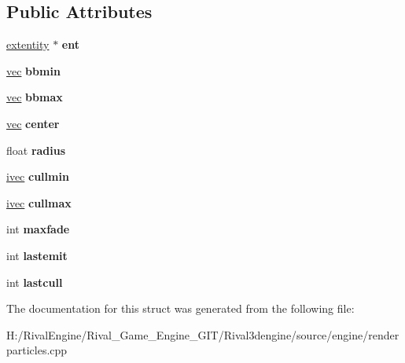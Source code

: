 \subsection*{Public Attributes}
\begin{DoxyCompactItemize}
\item 
\mbox{\label{structparticleemitter_a227cb6d3ccb8161b37e619051ff12115}} 
\hyperlink{structextentity}{extentity} $\ast$ {\bfseries ent}
\item 
\mbox{\label{structparticleemitter_a873b76c6e23d88732959a92e101f4396}} 
\hyperlink{structvec}{vec} {\bfseries bbmin}
\item 
\mbox{\label{structparticleemitter_a7436492610148e7f60366fd35efc529e}} 
\hyperlink{structvec}{vec} {\bfseries bbmax}
\item 
\mbox{\label{structparticleemitter_a535d90a0b4a4eb18e8eb6ff25d6d6117}} 
\hyperlink{structvec}{vec} {\bfseries center}
\item 
\mbox{\label{structparticleemitter_a2b1d94e711922c2f55142320bab257d0}} 
float {\bfseries radius}
\item 
\mbox{\label{structparticleemitter_ad4ea3a6d198c1d65aea2d0fa5afe6287}} 
\hyperlink{structivec}{ivec} {\bfseries cullmin}
\item 
\mbox{\label{structparticleemitter_ac090d7490c95e5e581994d4def8d6dca}} 
\hyperlink{structivec}{ivec} {\bfseries cullmax}
\item 
\mbox{\label{structparticleemitter_ad85ac6f61c5ca949e1042ad162535429}} 
int {\bfseries maxfade}
\item 
\mbox{\label{structparticleemitter_a5441af216e1d41efcdc3b51d140aba87}} 
int {\bfseries lastemit}
\item 
\mbox{\label{structparticleemitter_a224af73b2c79586ea24765ca3bdb57b9}} 
int {\bfseries lastcull}
\end{DoxyCompactItemize}


The documentation for this struct was generated from the following file\+:\begin{DoxyCompactItemize}
\item 
H\+:/\+Rival\+Engine/\+Rival\+\_\+\+Game\+\_\+\+Engine\+\_\+\+G\+I\+T/\+Rival3dengine/source/engine/renderparticles.\+cpp\end{DoxyCompactItemize}
